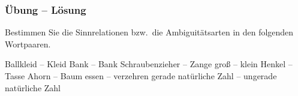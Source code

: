 
	
	\begin{frame}
		\frametitle{Übung -- Lösung}

Bestimmen Sie die Sinnrelationen bzw.\ die Ambiguitätsarten in den folgenden Wortpaaren.

\begin{exe}	
	 Ballkleid -- Kleid \pause \hfill {}
	 Bank -- Bank \pause \hfill {}
	 Schraubenzieher -- Zange \pause \hfill {}
	 gro\ss{} -- klein \pause \hfill {}
	 Henkel -- Tasse \pause \hfill {}
	 Ahorn -- Baum \pause \hfill {}
	 essen -- verzehren \pause \hfill {}
	 gerade natürliche Zahl -- ungerade  natürliche Zahl 
	
	\pause \hfill {}
\end{exe}

\end{frame}